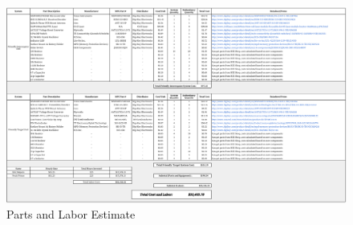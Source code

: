\documentclass[letterpaper,10pt]{article}
\begin{document}
\begin{spacing}{1.15}
\begin{figure} [H]
	\centering
	\includegraphics[scale = 0.9, angle=90]{Parts_and_Labor_Cost.pdf}
	\caption{Parts and Labor Estimate\label{fig:parts-cost-list}}
\end{figure}

\end{spacing}
\end{document}

